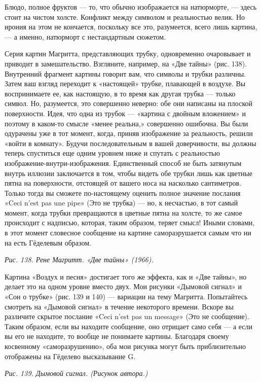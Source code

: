 \documentclass[../main.tex]{subfiles}
\begin{document}
Блюдо, полное фруктов --- то, что обычно изображается на натюрморте, --- здесь стоит на чистом холсте. Конфликт между символом и реальностью велик. Но ирония на этом не кончается, поскольку все это, разумеется, всего лишь картина, --- а именно, натюрморт с нестандартным сюжетом.

Серия картин Магритта, представляющих трубку, одновременно очаровывает и приводит в замешательство. Взгляните, например, на «Две тайны» (рис. 138). Внутренний фрагмент картины говорит вам, что символы и трубки различны. Затем ваш взгляд переходит к «настоящей» трубке, плавающей в воздухе. Вы воспринимаете ее, как настоящую, в то время как другая трубка --- только символ. Но, разумеется, это совершенно неверно: обе они написаны на плоской поверхности. Идея, что одна из трубок --- «картина с двойным вложением» и поэтому в каком-то смысле «менее реальна,» совершенно ошибочна. Вы были одурачены уже в тот момент, когда, приняв изображение за реальность, решили «войти в комнату». Будучи последовательным в вашей доверчивости, вы должны теперь спуститься еще одним уровнем ниже и спутать с реальностью изображение-внутри-изображения. Единственный способ не быть затянутым внутрь иллюзии заключается в том, чтобы видеть обе трубки лишь как цветные пятна на поверхности, отстоящей от вашего носа на насколько сантиметров. Только тогда вы сможете по-настоящему оценить полное значение послания «Ceci n'est pas une pipe» (Это не трубка) --- но, к несчастью, в тот самый момент, когда трубки превращаются в цветные пятна на холсте, то же самое происходит с надписью, которая, таким образом, теряет смысл! Иными словами, в этот момент словесное сообщение на картине саморазрушается самым что ни на есть Гёделевым образом.

\emph{Рис. 138. Рене Магритт. «Две тайны» (1966).}

Картина «Воздух и песня» достигает того же эффекта, как и «Две тайны», но делает это на одном уровне вместо двух. Мои рисунки «Дымовой сигнал» и «Сон о трубке» (рис. 139 и 140) --- вариации на тему Магритта. Попытайтесь смотреть на «Дымовой сигнал» в течение некоторого времени. Вскоре вы различите скрытое послание «Ceci n'est pas un message» (Это не сообщение). Таким образом, если вы находите сообщение, оно отрицает само себя --- а если вы его не находите, то вообще не понимаете картины. Благодаря своему косвенному «саморазрушению», оба мои рисунка могут быть приблизительно отображены на Гёделево высказывание G.

\emph{Рис. 139. Дымовой сигнал. (Рисунок автора.)}
\end{document}
